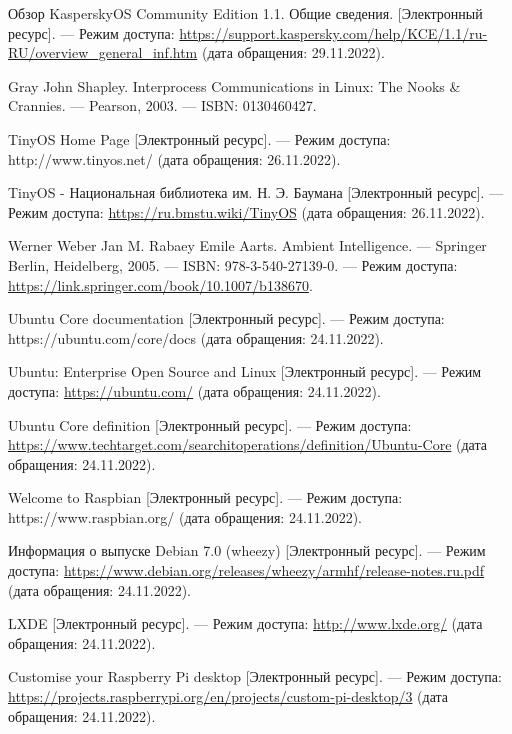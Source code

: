 \begin{thebibliography}{}
	Обзор KasperskyOS Community Edition 1.1. Общие сведения.
	[Электронный ресурс]. — Режим доступа: \url{https://support.kaspersky.com/help/KCE/1.1/ru-RU/overview_general_inf.htm} (дата обращения: 29.11.2022).
	
	Gray John Shapley. Interprocess Communications in Linux: The
	Nooks \& Crannies. — Pearson, 2003. — ISBN: 0130460427.
	
	TinyOS Home Page [Электронный ресурс]. — Режим доступа:
	{http://www.tinyos.net/} (дата обращения: 26.11.2022).
	
	TinyOS - Национальная библиотека им. Н. Э. Баумана [Электронный ресурс]. — Режим доступа: \url{https://ru.bmstu.wiki/TinyOS}
	(дата обращения: 26.11.2022).
	
	Werner Weber Jan M. Rabaey Emile Aarts.
	Ambient Intelligence. — Springer Berlin, Heidelberg, 2005. —
	ISBN: 978-3-540-27139-0. — Режим доступа: \url{https://link.springer.com/book/10.1007/b138670}.
	
	Ubuntu Core documentation [Электронный ресурс]. — Режим
	доступа: {https://ubuntu.com/core/docs} (дата обращения: 24.11.2022).
	
	Ubuntu: Enterprise Open Source and Linux [Электронный ресурс]. — Режим доступа: \url{https://ubuntu.com/} (дата обращения:
	24.11.2022).
	
	Ubuntu Core definition [Электронный ресурс]. — Режим доступа: \url{https://www.techtarget.com/searchitoperations/definition/Ubuntu-Core} (дата обращения: 24.11.2022).
	
	Welcome to Raspbian [Электронный ресурс]. — Режим доступа:
	{https://www.raspbian.org/} (дата обращения: 24.11.2022).
	
	Информация о выпуске Debian 7.0 (wheezy) [Электронный ресурс]. — Режим доступа: \url{https://www.debian.org/releases/wheezy/armhf/release-notes.ru.pdf} (дата обращения: 24.11.2022).
	
	LXDE [Электронный ресурс]. — Режим доступа: \url{http://www.lxde.org/} (дата обращения: 24.11.2022).
	
	Customise your Raspberry Pi desktop [Электронный ресурс]. —
	Режим доступа: \url{https://projects.raspberrypi.org/en/projects/custom-pi-desktop/3} (дата обращения: 24.11.2022).
	

\end{thebibliography}
